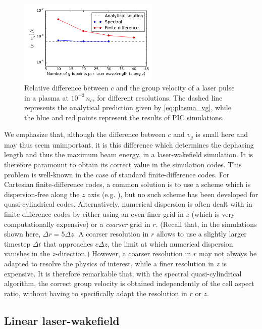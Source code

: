 \documentclass[1p,times]{elsarticle}
\begin{document}
\begin{figure}[!h]
\centering
\includegraphics[width=0.6\textwidth]{figures/Plasma_vg.pdf}
\caption{\label{fig:Plasma_vg}Relative difference between $c$ and the
group velocity of a laser pulse in a plasma at $10^{-3}\,n_c$, for different
resolutions. The dashed line represents
the analytical prediction given by \cref{eq:plasma_vg}, while the blue
and red points represent the results of PIC simulations.}
\end{figure}

We emphasize that, although the difference between $c$ and $v_g$ is
small here and may thus seem unimportant, it is this difference which determines
the dephasing length and thus the
maximum beam energy, in a laser-wakefield simulation. It is therefore
paramount to obtain its correct value in the simulation codes. This
problem is well-known in the case of standard finite-difference
codes. For Cartesian finite-difference codes, a common solution is to
use a scheme which is dispersion-free along the $z$ axis 
(e.g. \citep{Karkkainen,Pukhov,Nuter}), but no such scheme has been
developed for quasi-cylindrical codes. Alternatively, numerical dispersion is often 
dealt with in finite-difference codes by either using an even finer grid in
$z$ (which is very computationally expensive) or
a \emph{coarser} grid in $r$. (Recall that, in the simulations shown here, $\Delta r = 5\Delta
z$. A coarser resolution in $r$ allows to
use a slightly larger timestep $\Delta t$ that approaches $c\Delta z$, the limit 
at which numerical dispersion vanishes in the $z$-direction.) 
However, a coarser resolution in $r$ may not always be
adapted to resolve the physics of interest, while a finer resolution in $z$ 
is expensive. It is therefore remarkable 
that, with the spectral quasi-cylindrical algorithm, the correct group
velocity is obtained independently of the cell aspect ratio, without having to 
specifically adapt the resolution in $r$ or $z$.

\subsection{Linear laser-wakefield}
\end{document}
